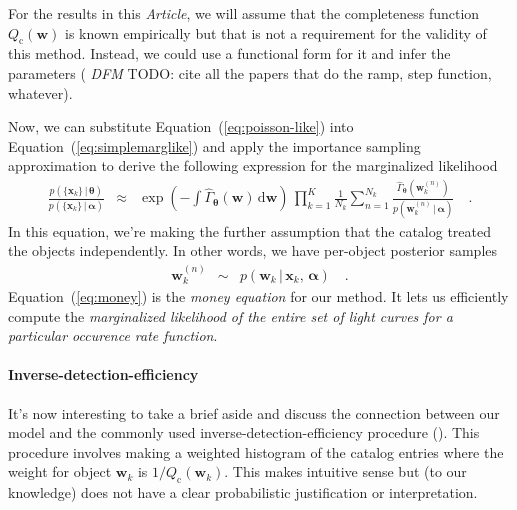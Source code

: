\documentclass[12pt,preprint]{aastex}
\newcommand{\paper}{\textsl{Article}}
\newcommand{\Eq}[1]{Equation~(\ref{eq:#1})}
\newcommand{\eq}[1]{\Eq{#1}}
\newcommand{\eqlabel}[1]{\label{eq:#1}}
\newcommand{\dd}{\ensuremath{\,\mathrm{d}}}
\newcommand{\bvec}[1]{\ensuremath{\boldsymbol{#1}}}
\newcommand{\todo}[3]{{\color{#2} \emph{#1} TODO: #3}}
\newcommand{\dfmtodo}[1]{\todo{DFM}{red}{#1}}
\newcommand{\rate}{\ensuremath{\Gamma}}
\newcommand{\ratepar}{{\ensuremath{\theta}}}
\newcommand{\ratepars}{{\ensuremath{\bvec{\ratepar}}}}
\newcommand{\obs}[1]{\ensuremath{\hat{#1}}}
\newcommand{\completeness}{{\ensuremath{Q_\mathrm{c}}}}
\newcommand{\data}{{\ensuremath{\bvec{x}}}}
\newcommand{\entry}{{\ensuremath{\bvec{w}}}}
\newcommand{\interim}{{\ensuremath{\bvec{\alpha}}}}
\begin{document}
For the results in this \paper, we will assume that the completeness function
$\completeness(\entry)$ is known empirically but that is not a requirement for
the validity of this method.
Instead, we could use a functional form for it and infer the parameters
(\dfmtodo{cite all the papers that do the ramp, step function, whatever}).

Now, we can substitute \eq{poisson-like} into \eq{simplemarglike} and apply
the importance sampling approximation to derive the following expression for
the marginalized likelihood
\begin{eqnarray}\eqlabel{money}
\frac{p(\{\data_k\}\,|\,\ratepars)}{p(\{\data_k\}\,|\,\interim)} &\approx&
    \exp\left(-\int \obs{\rate}_\ratepars (\entry) \dd\entry\right) \,
    \prod_{k=1}^K
    \frac{1}{N_k} \sum_{n=1}^{N_k}
    \frac{\obs{\rate}_\ratepars (\entry_k^{(n)})}
         {p(\entry_k^{(n)}\,|\,\interim)} \quad.
\end{eqnarray}
In this equation, we're making the further assumption that the catalog treated
the objects independently.
In other words, we have per-object posterior samples
\begin{eqnarray}
\entry_k^{(n)} &\sim& p(\entry_k\,|\,\data_k,\,\interim) \quad.
\end{eqnarray}
\Eq{money} is the \emph{money equation} for our method.
It lets us efficiently compute the \emph{marginalized likelihood of the entire
set of light curves for a particular occurence rate function}.

\paragraph{Inverse-detection-efficiency}
It's now interesting to take a brief aside and discuss the connection between
our model and the commonly used inverse-detection-efficiency procedure
(\citealt{howard,dressing,petigura}).
This procedure involves making a weighted histogram of the catalog entries
where the weight for object $\entry_k$ is $1/\completeness(\entry_k)$.
This makes intuitive sense but (to our knowledge) does not have a clear
probabilistic justification or interpretation.
\end{document}
